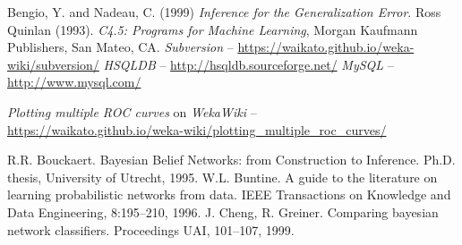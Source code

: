 \begin{thebibliography}{999}
		Bengio, Y. and Nadeau, C. (1999) \textit{Inference for the Generalization Error}.
		Ross Quinlan (1993). \textit{C4.5: Programs for Machine Learning}, Morgan Kaufmann Publishers, San Mateo, CA.
		\textit{Subversion} -- \url{https://waikato.github.io/weka-wiki/subversion/}{}
		\textit{HSQLDB} -- \url{http://hsqldb.sourceforge.net/}{}
		\textit{MySQL} -- \url{http://www.mysql.com/}{}

		\textit{Plotting multiple ROC curves} on \textit{WekaWiki} -- \\
		\small{\url{https://waikato.github.io/weka-wiki/plotting_multiple_roc_curves/}{}}

		R.R. Bouckaert. Bayesian Belief Networks: from Construction to Inference. 
		Ph.D. thesis, 
		University of Utrecht, 
		1995.
		W.L. Buntine. A guide to the literature on learning probabilistic networks from data.
		IEEE Transactions on Knowledge and Data Engineering, 8:195--210, 
		1996. 
		J. Cheng, R. Greiner. 
		Comparing bayesian network classifiers. 
		Proceedings UAI,
		101--107,
		1999.

    \newpage


\end{thebibliography}
